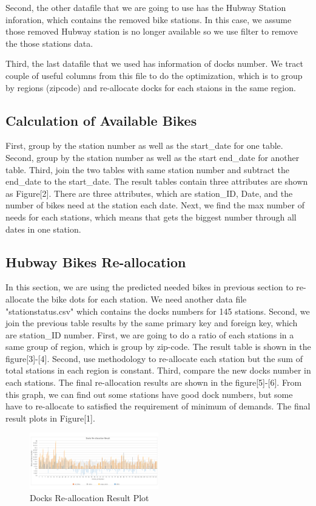 \documentclass[journal, letterpaper]{IEEEtran}
\begin{document}
Second, the other datafile that we are going to use has the Hubway Station inforation, which contains the removed bike stations. In this case, we assume those removed Hubway station is no longer available so we use filter to remove the those stations data. 

Third, the last datafile that we used has information of docks number. We tract couple of useful columns from this file to do the optimization, which is to group by regions (zipcode) and re-allocate docks for each staions in the same region. 

\subsection{Calculation of Available Bikes}
First, group by the station number as well as the start\_date for one table. 
Second, group by the station number as well as the start end\_date for another table.
Third, join the two tables with same station number and subtract the end\_date to the start\_date. 
The result tables contain three attributes are shown as Figure[2]. There are three attributes, which are station\_ID, Date, and the number of bikes need at the station each date. Next, we find the max number of needs for each stations, which means that gets the biggest number through all dates in one station. 

\subsection{Hubway Bikes Re-allocation}
In this section, we are using the predicted needed bikes in previous section to re-allocate the bike dots for each station. We need another data file "stationstatus.csv" which contains the docks numbers for 145 stations. Second, we join the previous table results by the same primary key and foreign key, which are station\_ID number. 
First, we are going to do a ratio of each stations in a same group of region, which is group by zip-code. The result table is shown in the figure[3]-[4]. 
Second, use methodology to re-allocate each station but the sum of total stations in each region is constant. 
Third, compare the new docks number in each stations. The final re-allocation results are shown in the figure[5]-[6]. 
From this graph, we can find out some stations have good dock numbers, but some have to re-allocate to satisfied the requirement of minimum of demands. The final result plots in Figure[1]. 
\begin{figure}
  \includegraphics[width=0.5\textwidth]{refl.png}
  \caption{Docks Re-allocation Result Plot}
  \label{fig:1}
\end{figure}
\end{document}
